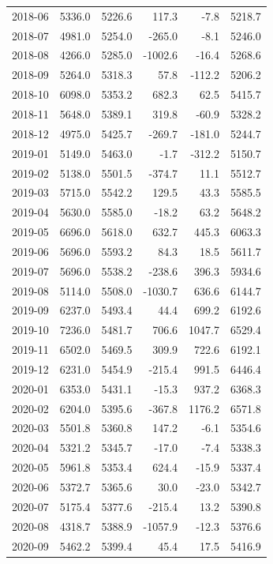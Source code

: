 \begin{longtable}{lrrrrr}
2018-06 & 5336.0 & 5226.6 & 117.3 & -7.8 & 5218.7 \\ 
2018-07 & 4981.0 & 5254.0 & -265.0 & -8.1 & 5246.0 \\ 
2018-08 & 4266.0 & 5285.0 & -1002.6 & -16.4 & 5268.6 \\ 
2018-09 & 5264.0 & 5318.3 & 57.8 & -112.2 & 5206.2 \\ 
2018-10 & 6098.0 & 5353.2 & 682.3 & 62.5 & 5415.7 \\ 
2018-11 & 5648.0 & 5389.1 & 319.8 & -60.9 & 5328.2 \\ 
2018-12 & 4975.0 & 5425.7 & -269.7 & -181.0 & 5244.7 \\ 
2019-01 & 5149.0 & 5463.0 & -1.7 & -312.2 & 5150.7 \\ 
2019-02 & 5138.0 & 5501.5 & -374.7 & 11.1 & 5512.7 \\ 
2019-03 & 5715.0 & 5542.2 & 129.5 & 43.3 & 5585.5 \\ 
2019-04 & 5630.0 & 5585.0 & -18.2 & 63.2 & 5648.2 \\ 
2019-05 & 6696.0 & 5618.0 & 632.7 & 445.3 & 6063.3 \\ 
2019-06 & 5696.0 & 5593.2 & 84.3 & 18.5 & 5611.7 \\ 
2019-07 & 5696.0 & 5538.2 & -238.6 & 396.3 & 5934.6 \\ 
2019-08 & 5114.0 & 5508.0 & -1030.7 & 636.6 & 6144.7 \\ 
2019-09 & 6237.0 & 5493.4 & 44.4 & 699.2 & 6192.6 \\ 
2019-10 & 7236.0 & 5481.7 & 706.6 & 1047.7 & 6529.4 \\ 
2019-11 & 6502.0 & 5469.5 & 309.9 & 722.6 & 6192.1 \\ 
2019-12 & 6231.0 & 5454.9 & -215.4 & 991.5 & 6446.4 \\ 
2020-01 & 6353.0 & 5431.1 & -15.3 & 937.2 & 6368.3 \\ 
2020-02 & 6204.0 & 5395.6 & -367.8 & 1176.2 & 6571.8 \\ 
2020-03 & 5501.8 & 5360.8 & 147.2 & -6.1 & 5354.6 \\ 
2020-04 & 5321.2 & 5345.7 & -17.0 & -7.4 & 5338.3 \\ 
2020-05 & 5961.8 & 5353.4 & 624.4 & -15.9 & 5337.4 \\ 
2020-06 & 5372.7 & 5365.6 & 30.0 & -23.0 & 5342.7 \\ 
2020-07 & 5175.4 & 5377.6 & -215.4 & 13.2 & 5390.8 \\ 
2020-08 & 4318.7 & 5388.9 & -1057.9 & -12.3 & 5376.6 \\ 
2020-09 & 5462.2 & 5399.4 & 45.4 & 17.5 & 5416.9 \\ 

\end{longtable}
